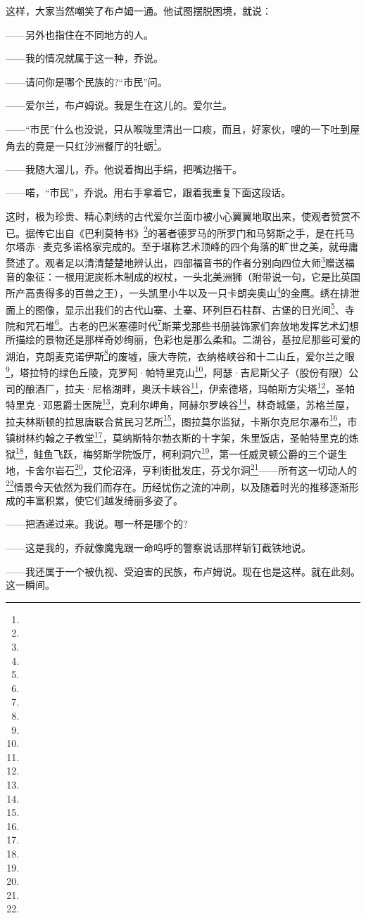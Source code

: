 \par 这样，大家当然嘲笑了布卢姆一通。他试图摆脱困境，就说：
\par ——另外也指住在不同地方的人。
\par ——我的情况就属于这一种，乔说。
\par ——请问你是哪个民族的?“市民”问。
\par ——爱尔兰，布卢姆说。我是生在这儿的。爱尔兰。
\par ——“市民”什么也没说，只从喉咙里清出一口痰，而且，好家伙，嗖的一下吐到屋角去的竟是一只红沙洲餐厅的牡蛎\footnote{}。
\par ——我随大溜儿，乔。他说着掏出手绢，把嘴边揩干。
\par ——喏，“市民”，乔说。用右手拿着它，跟着我重复下面这段话。
\par 这时，极为珍贵、精心刺绣的古代爱尔兰面巾被小心翼翼地取出来，使观者赞赏不已。据传它出自《巴利莫特书》\footnote{}的著者德罗马的所罗门和马努斯之手，是在托马尔塔赤·麦克多诺格家完成的。至于堪称艺术顶峰的四个角落的旷世之美，就毋庸赘述了。观者足以清清楚楚地辨认出，四部福音书的作者分别向四位大师\footnote{}赠送福音的象征：一根用泥炭栎木制成的权杖，一头北美洲狮（附带说一句，它是比英国所产高贵得多的百兽之王），一头凯里小牛以及一只卡朗突奥山\footnote{}的金鹰。绣在排泄面上的图像，显示出我们的古代山寨、土寨、环列巨石柱群、古堡的日光间\footnote{}、寺院和咒石堆\footnote{}。古老的巴米塞德时代\footnote{}斯莱戈那些书册装饰家们奔放地发挥艺术幻想所描绘的景物还是那样奇妙绚丽，色彩也是那么柔和。二湖谷，基拉尼那些可爱的湖泊，克朗麦克诺伊斯\footnote{}的废墟，康大寺院，衣纳格峡谷和十二山丘，爱尔兰之眼\footnote{}，塔拉特的绿色丘陵，克罗阿·帕特里克山\footnote{}，阿瑟·吉尼斯父子（股份有限）公司的酿酒厂，拉夫·尼格湖畔，奥沃卡峡谷\footnote{}，伊索德塔，玛帕斯方尖塔\footnote{}，圣帕特里克·邓恩爵士医院\footnote{}，克利尔岬角，阿赫尔罗峡谷\footnote{}，林奇城堡，苏格兰屋，拉夫林斯顿的拉思唐联合贫民习艺所\footnote{}，图拉莫尔监狱，卡斯尔克尼尔瀑布\footnote{}，市镇树林约翰之子教堂\footnote{}，莫纳斯特尔勃衣斯的十字架，朱里饭店，圣帕特里克的炼狱\footnote{}，鲑鱼飞跃，梅努斯学院饭厅，柯利洞穴\footnote{}，第一任威灵顿公爵的三个诞生地，卡舍尔岩石\footnote{}，艾伦沼泽，亨利街批发庄，芬戈尔洞\footnote{}——所有这一切动人的\footnote{}情景今天依然为我们而存在。历经忧伤之流的冲刷，以及随着时光的推移逐渐形成的丰富积累，使它们越发绮丽多姿了。
\par ——把酒递过来。我说。哪一杯是哪个的?
\par ——这是我的，乔就像魔鬼跟一命呜呼的警察说话那样斩钉截铁地说。
\par ——我还属于一个被仇视、受迫害的民族，布卢姆说。现在也是这样。就在此刻。这一瞬间。
